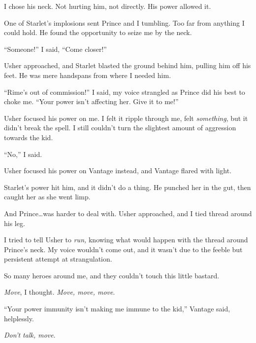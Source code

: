 I chose his neck.  Not hurting him, not directly.  His power allowed it.



One of Starlet's implosions sent Prince and I tumbling.  Too far from anything I could hold.  He found the opportunity to seize me by the neck.



``Someone!''  I said, ``Come closer!''



Usher approached, and Starlet blasted the ground behind him, pulling him off his feet.  He was mere handspans from where I needed him.



``Rime's out of commission!'' I said, my voice strangled as Prince did his best to choke me.  ``Your power isn't affecting her.  Give it to me!''



Usher focused his power on me.  I felt it ripple through me, felt \emph{something}, but it didn't break the spell.  I still couldn't turn the slightest amount of aggression towards the kid.



``No,'' I said.



Usher focused his power on Vantage instead, and Vantage flared with light.



Starlet's power hit him, and it didn't do a thing.  He punched her in the gut, then caught her as she went limp.



And Prince\ldots was harder to deal with.  Usher approached, and I tied thread around his leg.



I tried to tell Usher to \emph{run, }knowing what would happen with the thread around Prince's neck.  My voice wouldn't come out, and it wasn't due to the feeble but persistent attempt at strangulation.



So many heroes around me, and they couldn't touch this little bastard.



\emph{Move}, I thought.  \emph{Move, move, move}.



``Your power immunity isn't making me immune to the kid,'' Vantage said, helplessly.



\emph{Don't talk, move}.



